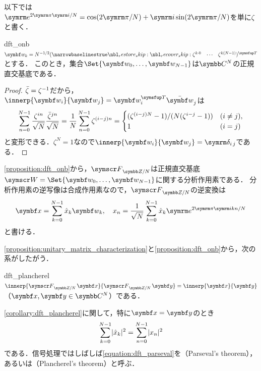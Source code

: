 \documentclass[../../main]{subfiles}
\begin{document}
以下では\(\napr^{2\krez\iuni/N}=\cos(2\krez/N)+\iuni\sin(2\krez/N)\)を単に\(\zeta\)と書く．

\begin{proposition}{}{dft_onb}
  \(\vect{w}_k=N^{-1/2}\trps{\rowvect{\zeta^{k\cdot 0} & \cdots & \zeta^{k(N-1)}}}\)とする．
  このとき，集合\(\Set{\vect{w}_0,\dots,\vect{w}_{N-1}}\)は\(\numset{C}^N\)の正規直交基底である．
\end{proposition}

\begin{proof}
  \(\conj{\zeta}=\zeta^{-1}\)だから，\(\innerp{\vect{w}_i}{\vect{w}_j}=\trps{\vect{w}_i}\conj{\vect{w}}_j\)は
  \[
    \sum_{n=0}^{N-1}\frac{\zeta^{in}}{\sqrt{N}}\frac{\conj{\zeta}^{jn}}{\sqrt{N}} = \frac{1}{N}\sum_{n=0}^{N-1}\zeta^{(i-j)n}
    = \begin{cases}(\zeta^{(i-j)N}-1)/(N(\zeta^{i-j}-1)) & (i\neq j), \\ 1 & (i=j)\end{cases}
  \]
  と変形できる．\(\zeta^N=1\)なので\(\innerp{\vect{w}_i}{\vect{w}_j}=\kdelta{i}{j}\)である．
\end{proof}

\cref{proposition:dft_onb}から，\(\dft{N}\)は正規直交基底\(\basis{W}=\Set{\vect{w}_0,\dots,\vect{w}_{N-1}}\)に関する分析作用素である．
分析作用素の逆写像は合成作用素なので，\(\dft{N}\)の逆変換は
\begin{equation}
  \label{equation:idft}
  \vect{x} = \sum_{k=0}^{N-1}\hat{x}_k\vect{w}_k,
  \quad x_n = \frac{1}{\sqrt{N}}\sum_{k=0}^{N-1}\hat{x}_k\napr^{2\krez\iuni kn/N}
\end{equation}
と書ける．

\cref{proposition:unitary_matrix_characterization}と\cref{proposition:dft_onb}から，次の系がしたがう．

\begin{corollary}{}{dft_plancherel}
  \(\innerp{\dft{N}\vect{x}}{\dft{N}\vect{y}}=\innerp{\vect{x}}{\vect{y}}\)（\(\vect{x},\vect{y}\in\numset{C}^N\)）である．
\end{corollary}

\cref{corollary:dft_plancherel}に関して，特に\(\vect{x}=\vect{y}\)のとき
\begin{equation}
  \label{equation:dft_parseval}
  \sum_{k=0}^{N-1}\lvert\hat{x}_k\rvert^2 = \sum_{n=0}^{N-1}\lvert x_n\rvert^2
\end{equation}
である．信号処理ではしばしば\cref{equation:dft_parseval}を（Parseval's theorem），あるいは（Plancherel's theorem）と呼ぶ．
\end{document}
